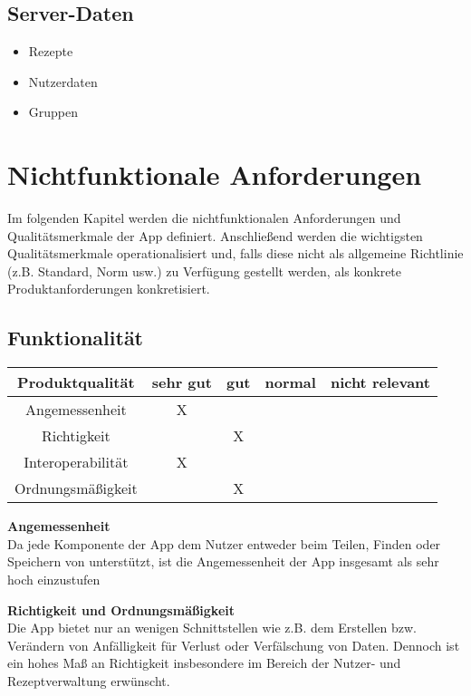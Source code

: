 \documentclass[parskip=full]{scrartcl}
\newcommand{\changelocaltocdepth}[1]{%
  \addtocontents{toc}{\protect\setcounter{tocdepth}{#1}}%
  \setcounter{tocdepth}{#1}%
}
\newcommand{\resetsubsectionnumbering}{
    \renewcommand{\thesubsection}{\arabic{section}.\arabic{subsection}}
    \changelocaltocdepth{3} 
}
\begin{document}
\subsection{Server-Daten}
\begin{itemize}
    \item Rezepte
    \item Nutzerdaten
    \item Gruppen
\end{itemize}

\resetsubsectionnumbering
\section{Nichtfunktionale Anforderungen}
Im folgenden Kapitel werden die nichtfunktionalen Anforderungen und Qualitätsmerkmale der App definiert.
Anschließend werden die wichtigsten Qualitätsmerkmale operationalisiert und, falls diese nicht als allgemeine Richtlinie (z.B. Standard, Norm usw.) zu Verfügung gestellt werden,
als konkrete Produktanforderungen konkretisiert.

\subsection{Funktionalität}
\begin{tabular}{| c | c | c | c | c |}
    \hline
    \textbf{ Produktqualität } & \textbf{sehr gut} & \textbf{gut} & \textbf{normal} & \textbf{nicht relevant} \\ \hline
    Angemessenheit             & X                 &              &                 &                         \\ \hline
    Richtigkeit                &                   & X            &                 &                         \\ \hline
    Interoperabilität          & X                 &              &                 &                         \\ \hline
    Ordnungsmäßigkeit          &                   & X            &                 &                         \\ \hline
\end{tabular}

\textbf{Angemessenheit}\\
Da jede Komponente der App dem Nutzer entweder beim Teilen, Finden oder Speichern von  unterstützt, ist die Angemessenheit der App insgesamt als sehr hoch einzustufen

\textbf{Richtigkeit und Ordnungsmäßigkeit}\\
Die App bietet nur an wenigen Schnittstellen wie z.B. dem Erstellen bzw. Verändern von  Anfälligkeit für Verlust oder Verfälschung von Daten. Dennoch ist ein hohes Maß an Richtigkeit insbesondere im Bereich der Nutzer- und Rezeptverwaltung erwünscht.
\end{document}
